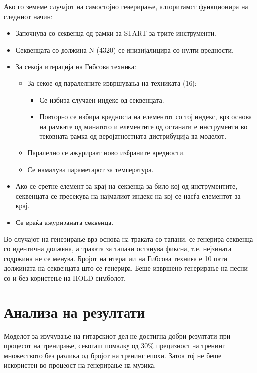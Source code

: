 Ако го земеме случајот на самостојно генерирање, алгоритамот функционира на следниот начин:
\begin{itemize}
    \item Започнува со секвенца од рамки за START за трите инструменти.
    \item Секвенцата со должина N (4320) се инизијалицира со нулти вредности.
    \item За секоја итерација на Гибсова техника: \begin{itemize}
        \item За секое од паралелните извршувања на техниката (16): \begin{itemize}
            \item Се избира случаен индекс од секвенцата.
            \item Повторно се избира вредноста на елементот со тој индекс, врз основа на рамките од минатото и елементите од останатите инструменти во тековната рамка од веројатностната дистрибуција на моделот.
        \end{itemize}
    \item Паралелно се ажурираат ново избраните вредности.
    \item Се намалува параметарот за температура.
    \end{itemize}
    \item Ако се сретне елемент за крај на секвенца за било кој од инструментите, секвенцата се пресекува на најмалиот индекс на кој се наоѓа елементот за крај.
    \item Се враќа ажурираната секвенца.
\end{itemize}

Во случајот на генерирање врз основа на траката со тапани, се генерира секвенца со идентична должина, а траката за тапани останува фиксна, т.е. нејзината содржина не се менува. Бројот на итерации на Гибсова техника е 10 пати должината на секвенцата што се генерира. Беше извршено генерирање на песни со и без користење на HOLD симболот.

\section{Анализа на резултати}

Моделот за изучување на гитарскиот дел не достигна добри резултати при процесот на тренирање, секогаш помалку од 30\% прецизност на тренинг множеството без разлика од бројот на тренинг епохи. Затоа тој не беше искористен во процеост на генерирање на музика. 


